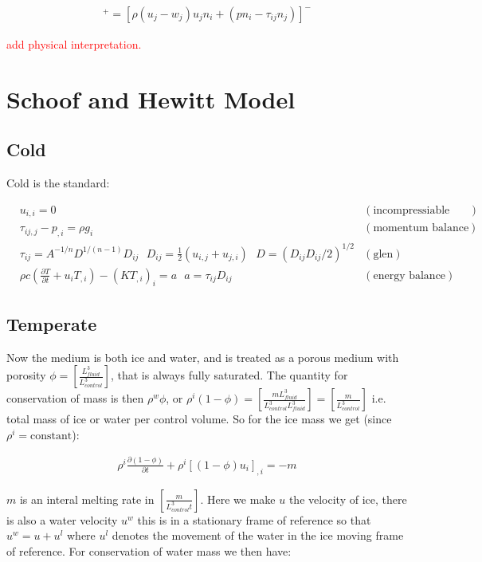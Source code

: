 \documentclass[a4paper,12pt]{article}
\newcommand{\pd}[2]{\frac{\partial #1}{\partial #2}}
\begin{document}
\begin{align}
  [\rho (u_j - w_j) u_j n_i +  (pn_i - \tau_{ij}n_j)]^+ = [\rho (u_j - w_j) u_j n_i  +  (pn_i - \tau_{ij}n_j)]^-
\end{align}

\textcolor{red}{add physical interpretation.}
  
\section{Schoof and Hewitt Model}

\subsection{Cold}

Cold is the standard:

\begin{align}
  &u_{i,i} = 0 & (\text{incompressiable mass balance})\\
  &\tau_{ij,j} - p_{,i} = \rho g_i & (\text{momentum balance})\\
  &\tau_{ij} = A^{-1/n} D^{1/(n-1)} D_{ij} ~~~ D_{ij} = \frac{1}{2}(u_{i,j} + u_{j,i}) ~~~ D = (D_{ij}D_{ij}/2)^{1/2} & (\text{glen})\\
  & \rho c \left(\pd{T}{t} + u_i T_{,i} \right) - (KT_{,i})_i = a ~~~ a = \tau_{ij}D_{ij} & (\text{energy balance})
\end{align}

\subsection{Temperate}

Now the medium is both ice and water, and is treated as a porous medium with porosity $\phi = \left[\frac{L^3_{fluid}}{L^3_{control}}\right]$, that is always fully saturated. The quantity for conservation of mass is then $\rho^w\phi$, or $\rho^i (1 - \phi) = \left[\frac{m L^3_{fluid}}{L^3_{control}L^3_{fluid}}\right] = \left[\frac{m}{L^3_{control}}\right]$ i.e. total mass of ice or water per control volume. So for the ice mass we get (since $\rho^i = \text{constant}$):

\begin{align}
  \rho^i\pd{(1 - \phi)}{t} + \rho^i [(1 - \phi) u_i]_{,i} = - m \label{eq:conservation-ice-mass}
\end{align}

$m$ is an interal melting rate in $\left[\frac{m}{L^3_{control} t}\right]$. Here we make $u$ the velocity of ice, there is also a water velocity $u^w$ this is in a stationary frame of reference so that $u^w = u + u^l$ where $u^l$ denotes the movement of the water in the ice moving frame of reference. For conservation of water mass we then have:
\end{document}
